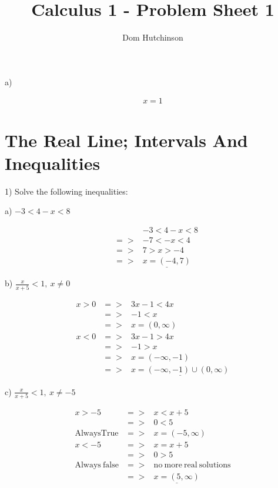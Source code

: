 \documentclass[11pt]{article}
\begin{document}
\title{Calculus 1 - Problem Sheet 1}
\author{Dom Hutchinson}
\maketitle

\begin{flushleft} a) $\displaystyle{} $ \end{flushleft}
\begin{eqnarray*}
x=1
\end{eqnarray*}

\section{The Real Line; Intervals And Inequalities}
\begin{flushleft} 1) Solve the following inequalities: \end{flushleft}

\begin{flushleft} a) $-3<4-x<8$ \end{flushleft}
\begin{eqnarray*}
&&-3<4-x<8\\
&=>&-7<-x<4\\
&=>&7>x>-4\\
&=>&\underline{x=(-4,7)}
\end{eqnarray*}

\begin{flushleft} b) $\frac{x}{x+5}<1,\ x\neq 0$ \end{flushleft}
\begin{eqnarray*}
x>0 &=>& 3x-1<4x\\
&=>& -1<x\\
&=>& x=(0,\infty)\\
x<0 &=>& 3x-1>4x\\
&=>& -1>x\\
&=>& x=(-\infty ,-1)\\
&=>& \underline{x=(-\infty ,-1)\cup(0,\infty)}
\end{eqnarray*}

\begin{flushleft} c) $\frac{x}{x+5}<1,\ x\neq -5$ \end{flushleft}
\begin{eqnarray*}
x>-5 &=>& x<x+5\\
&=>& 0<5\\
\mathrm{Always True} &=>& x =(-5,\infty)\\
x<-5 &=>&x=x+5\\
&=>&0>5\\
\mathrm{Always\ false}&=>&\mathrm{no\ more\ real\ solutions}\\
&=>& \underline{x=(5,\infty)}
\end{eqnarray*}
\end{document}
